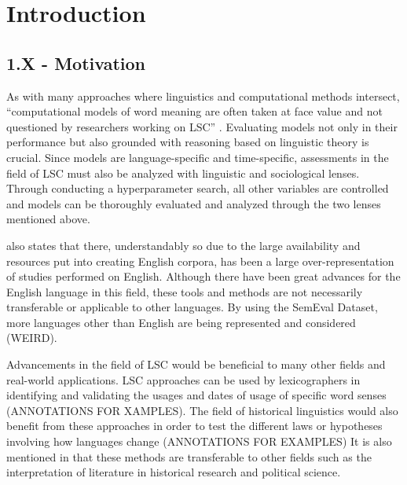
\section{Introduction}
\label{sec:intro}

\subsection{1.X - Motivation}
As with many approaches where linguistics and computational methods intersect, “computational models of word meaning are often taken at face value and not questioned by researchers working on LSC” \citep{hengchen2021challenges}. Evaluating models not only in their performance but also grounded with reasoning based on linguistic theory is crucial. Since models are language-specific and time-specific, assessments in the field of LSC must also be analyzed with linguistic and sociological lenses. Through conducting a hyperparameter search, all other variables are controlled and models can be thoroughly evaluated and analyzed through the two lenses mentioned above. 

\citet{hengchen2021challenges} also states that there, understandably so due to the large availability and resources put into creating English corpora, has been a large over-representation of studies performed on English. Although there have been great advances for the English language in this field, these tools and methods are not necessarily transferable or applicable to other languages. By using the SemEval Dataset, more languages other than English are being represented and considered (WEIRD).  

Advancements in the field of LSC would be beneficial to many other fields and real-world applications. LSC approaches can be used by lexicographers in identifying and validating the usages and dates of usage of specific word senses (ANNOTATIONS FOR XAMPLES). The field of historical linguistics would also benefit from these approaches in order to test the different laws or hypotheses involving how languages change (ANNOTATIONS FOR EXAMPLES) It is also mentioned in \citet{hengchen2021challenges} that these methods are transferable to other fields such as the interpretation of literature in historical research and political science.  
